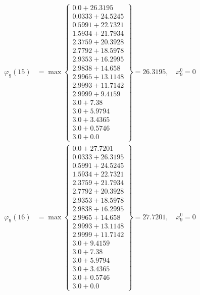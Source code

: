 \documentclass{article}
\begin{document}
\begin{align*}
  
\varphi_{9}(15) &= \max \left\{ \begin{array}{c}
0.0 + 26.3195 \\
 0.0333 + 24.5245 \\
 0.5991 + 22.7321 \\
 1.5934 + 21.7934 \\
 2.3759 + 20.3928 \\
 2.7792 + 18.5978 \\
 2.9353 + 16.2995 \\
 2.9838 + 14.658 \\
 2.9965 + 13.1148 \\
 2.9993 + 11.7142 \\
 2.9999 + 9.4159 \\
 3.0 + 7.38 \\
 3.0 + 5.9794 \\
 3.0 + 3.4365 \\
 3.0 + 0.5746 \\
 3.0 + 0.0
\end{array} \right\}=26.3195,\quad x_{9}^0=0\\
  
  
  
  
\varphi_{9}(16) &= \max \left\{ \begin{array}{c}
0.0 + 27.7201 \\
 0.0333 + 26.3195 \\
 0.5991 + 24.5245 \\
 1.5934 + 22.7321 \\
 2.3759 + 21.7934 \\
 2.7792 + 20.3928 \\
 2.9353 + 18.5978 \\
 2.9838 + 16.2995 \\
 2.9965 + 14.658 \\
 2.9993 + 13.1148 \\
 2.9999 + 11.7142 \\
 3.0 + 9.4159 \\
 3.0 + 7.38 \\
 3.0 + 5.9794 \\
 3.0 + 3.4365 \\
 3.0 + 0.5746 \\
 3.0 + 0.0
\end{array} \right\}=27.7201,\quad x_{9}^0=0\\
  
  
  

\end{align*}
\end{document}
